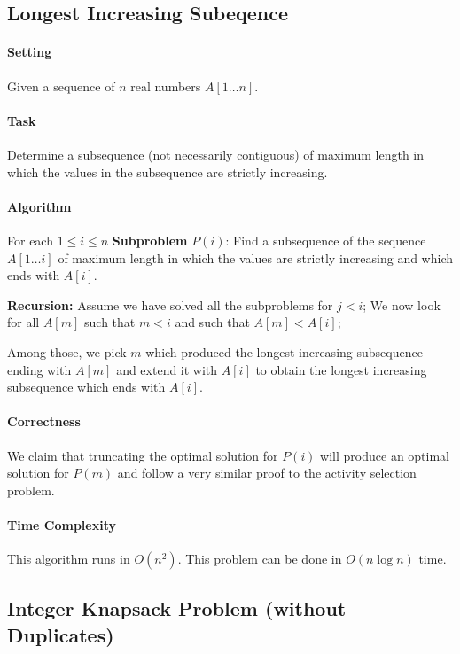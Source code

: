 \subsection{Longest Increasing Subeqence}
\paragraph{Setting} 
Given a sequence of \(n\) real numbers \(A[1\dots n]\).

\paragraph{Task}
Determine a subsequence (not necessarily contiguous) of maximum length in which the values in the subsequence are strictly increasing.

\paragraph{Algorithm}
For each \(1 \leq i \leq n\) \textbf{Subproblem} \(P(i)\): Find a subsequence of the sequence \(A[1\dots i]\) of maximum length in which the values are strictly increasing and which ends with \(A[i]\).

\textbf{Recursion:} Assume we have solved all the subproblems for \(j < i\);
We now look for all \(A[m]\) such that \(m < i\) and such that \(A[m] < A[i]\);

Among those, we pick \(m\) which produced the longest increasing subsequence ending with \(A[m]\) and extend it with \(A[i]\) to obtain the longest increasing subsequence which ends with \(A[i]\).

\paragraph{Correctness}
We claim that truncating the optimal solution for \(P(i)\) will produce an optimal solution for \(P(m)\) and follow a very similar proof to the activity selection problem.

\paragraph{Time Complexity}
This algorithm runs in \(O(n^2)\). This problem can be done in \(O(n\log n)\) time.

\subsection{Integer Knapsack Problem (without Duplicates)}
